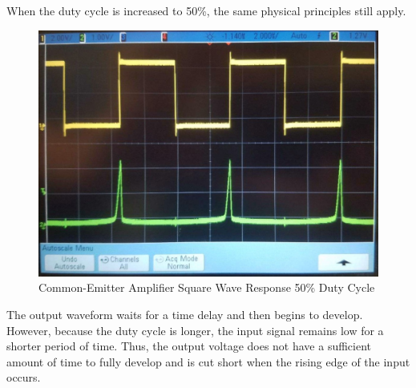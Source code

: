 When the duty cycle is increased to 50\%, the same physical principles still apply.
\FloatBarrier
\begin{figure}[h!]
	\centering
	\includegraphics[scale=0.25]{./images/amplifier_50_duty_cycle.jpeg}
	\caption{Common-Emitter Amplifier Square Wave Response 50\% Duty Cycle}
	\label{fig:fifty_perc_duty_cycle}
\end{figure}
\FloatBarrier
The output waveform waits for a time delay and then begins to develop. However, because the duty cycle is longer, the input signal remains low for a shorter period of time. Thus, the output voltage does not have a sufficient amount of time to fully develop and is cut short when the rising edge of the input occurs. \\
